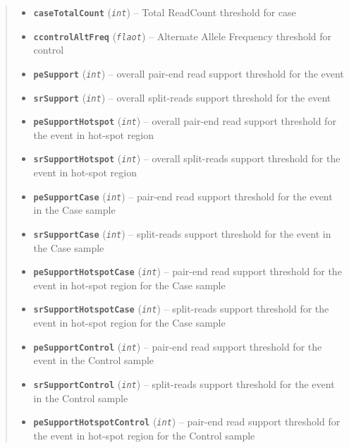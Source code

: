 \documentclass[letterpaper,10pt,english]{sphinxmanual}
\begin{document}
\begin{fulllineitems}
\begin{quote}
\begin{description}
\begin{itemize}
\item {} 
\textbf{\texttt{caseTotalCount}} (\emph{\texttt{int}}) -- Total ReadCount threshold for case

\item {} 
\textbf{\texttt{ccontrolAltFreq}} (\emph{\texttt{flaot}}) -- Alternate Allele Frequency threshold for control

\item {} 
\textbf{\texttt{peSupport}} (\emph{\texttt{int}}) -- overall pair-end read support threshold for the event

\item {} 
\textbf{\texttt{srSupport}} (\emph{\texttt{int}}) -- overall split-reads support threshold for the event

\item {} 
\textbf{\texttt{peSupportHotspot}} (\emph{\texttt{int}}) -- overall pair-end read support threshold for the event in hot-spot region

\item {} 
\textbf{\texttt{srSupportHotspot}} (\emph{\texttt{int}}) -- overall split-reads support threshold for the event in hot-spot region

\item {} 
\textbf{\texttt{peSupportCase}} (\emph{\texttt{int}}) -- pair-end read support threshold for the event in the Case sample

\item {} 
\textbf{\texttt{srSupportCase}} (\emph{\texttt{int}}) -- split-reads support threshold for the event in the Case sample

\item {} 
\textbf{\texttt{peSupportHotspotCase}} (\emph{\texttt{int}}) -- pair-end read support threshold for the event in hot-spot region for the Case sample

\item {} 
\textbf{\texttt{srSupportHotspotCase}} (\emph{\texttt{int}}) -- split-reads support threshold for the event in hot-spot region for the Case sample

\item {} 
\textbf{\texttt{peSupportControl}} (\emph{\texttt{int}}) -- pair-end read support threshold for the event in the Control sample

\item {} 
\textbf{\texttt{srSupportControl}} (\emph{\texttt{int}}) -- split-reads support threshold for the event in the Control sample

\item {} 
\textbf{\texttt{peSupportHotspotControl}} (\emph{\texttt{int}}) -- pair-end read support threshold for the event in hot-spot region for the Control sample


\end{itemize}
\end{description}
\end{quote}
\end{fulllineitems}
\end{document}
